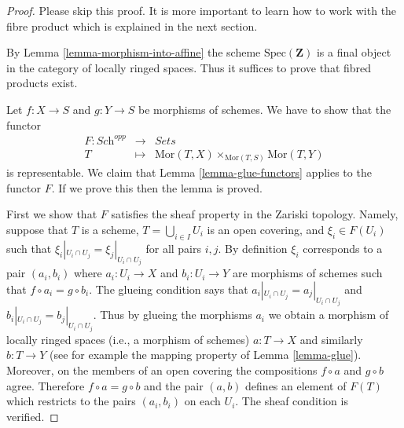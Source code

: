 \begin{proof}
Please skip this proof. It is more important to learn
how to work with the fibre product which is explained in
the next section.

\medskip\noindent
By Lemma \ref{lemma-morphism-into-affine}
the scheme $\text{Spec}(\mathbf{Z})$ is a final
object in the category of locally ringed spaces. Thus it
suffices to prove that fibred products exist. 

\medskip\noindent
Let $f : X \to S$ and $g : Y \to S$ be morphisms of schemes. We have to show
that the functor
\begin{eqnarray*}
F : \textit{Sch}^{opp} & \longrightarrow & \textit{Sets} \\
T & \longmapsto &
\text{Mor}(T, X) \times_{\text{Mor}(T, S)} \text{Mor}(T, Y)
\end{eqnarray*}
is representable. We claim that Lemma \ref{lemma-glue-functors}
applies to the functor $F$. If we prove this then the lemma is proved.

\medskip\noindent
First we show that $F$ satisfies the sheaf property in the
Zariski topology. Namely, suppose that $T$ is a scheme,
$T = \bigcup_{i \in I} U_i$ is an open covering, and
$\xi_i \in F(U_i)$ such that
$\xi_i|_{U_i \cap U_j} =  \xi_j|_{U_i \cap U_j}$ for
all pairs $i, j$. By definition $\xi_i$ corresponds to
a pair $(a_i, b_i)$ where $a_i : U_i \to X$ and $b_i : U_i \to Y$
are morphisms of schemes such that $f \circ a_i = g \circ b_i$.
The glueing condition says that
$a_i|_{U_i \cap U_j} =  a_j|_{U_i \cap U_j}$
and
$b_i|_{U_i \cap U_j} =  b_j|_{U_i \cap U_j}$.
Thus by glueing the morphisms $a_i$ we obtain a morphism
of locally ringed spaces (i.e., a morphism of schemes)
$a : T \to X$ and similarly $b : T \to Y$ (see for example
the mapping property of Lemma \ref{lemma-glue}). Moreover,
on the members of an open covering the compositions
$f \circ a$ and $g \circ b$ agree. Therefore
$f \circ a = g \circ b$ and the pair $(a, b)$ defines
an element of $F(T)$ which restricts to the pairs
$(a_i, b_i)$ on each $U_i$. The sheaf condition is verified.


\end{proof}
